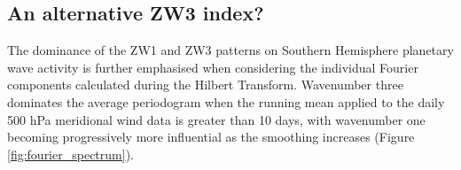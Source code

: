 \subsection{An alternative ZW3 index?}

The dominance of the ZW1 and ZW3 patterns on Southern Hemisphere planetary wave activity is further emphasised when considering the individual Fourier components calculated during the Hilbert Transform. Wavenumber three dominates the average periodogram when the running mean applied to the daily 500 hPa meridional wind data is greater than 10 days, with wavenumber one becoming progressively more influential as the smoothing increases (Figure \ref{fig:fourier_spectrum}).

